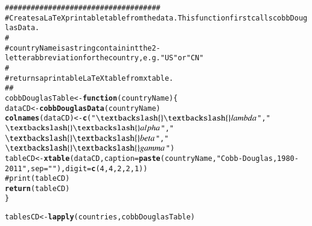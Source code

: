 \documentclass[preprint,authoryear,12pt]{elsarticle}\usepackage{graphicx, color}
\makeatletter
\newcommand{\hlfunctioncall}[1]{\textcolor[rgb]{0.501960784313725,0,0.329411764705882}{\textbf{#1}}}%
\newcommand{\hlstring}[1]{\textcolor[rgb]{0.6,0.6,1}{#1}}%
\newcommand{\hlcomment}[1]{\textcolor[rgb]{0.180392156862745,0.6,0.341176470588235}{#1}}%
\newenvironment{kframe}{%
 \def\at@end@of@kframe{}%
 \ifinner\ifhmode%
  \def\at@end@of@kframe{\end{minipage}}%
  \begin{minipage}{\columnwidth}%
 \fi\fi%
 \def\FrameCommand##1{\hskip\@totalleftmargin \hskip-\fboxsep
 \colorbox{shadecolor}{##1}\hskip-\fboxsep
     \hskip-\linewidth \hskip-\@totalleftmargin \hskip\columnwidth}%
 \MakeFramed {\advance\hsize-\width
   \@totalleftmargin\z@ \linewidth\hsize
   \@setminipage}}%
 {\par\unskip\endMakeFramed%
 \at@end@of@kframe}
\newenvironment{knitrout}{}{} %
\makeatother
\begin{document}
\begin{knitrout}
\begin{kframe}
\begin{alltt}
\hlcomment{####################################}
\hlcomment{# Creates a LaTeX printable table from the data. This function first calls cobbDouglasData.}
\hlcomment{#}
\hlcomment{# countryName is a string containint the 2-letter abbreviation for the country, e.g. "US" or "CN"}
\hlcomment{#}
\hlcomment{# returns a printable LaTeX table from xtable.}
\hlcomment{##}
cobbDouglasTable <- \hlfunctioncall{function}(countryName)\{
  dataCD <- \hlfunctioncall{cobbDouglasData}(countryName) 
  \hlfunctioncall{colnames}(dataCD) <- \hlfunctioncall{c}(\hlstring{"$\textbackslash{}\textbackslash{}lambda$"}, \hlstring{"$\textbackslash{}\textbackslash{}alpha$"}, \hlstring{"$\textbackslash{}\textbackslash{}beta$"}, \hlstring{"$\textbackslash{}\textbackslash{}gamma$"})
  tableCD <- \hlfunctioncall{xtable}(dataCD, caption=\hlfunctioncall{paste}(countryName, \hlstring{" Cobb-Douglas, 1980-2011"}, sep=\hlstring{""}), digit = \hlfunctioncall{c}(4, 4, 2, 2, 1))
\hlcomment{  #print(tableCD)}
  \hlfunctioncall{return}(tableCD)  
\}
\end{alltt}
\end{kframe}
\end{knitrout}


\begin{knitrout}
\color{fgcolor}\begin{kframe}
\begin{alltt}
tablesCD <- \hlfunctioncall{lapply}(countries, cobbDouglasTable)
\end{alltt}


{\ttfamily\noindent\itshape\color{messagecolor}{Waiting for profiling to be done...}}

{\ttfamily\noindent\bfseries\color{errorcolor}{Error: could not find function "deltaMethod"}}\end{kframe}
\end{knitrout}
\end{document}
